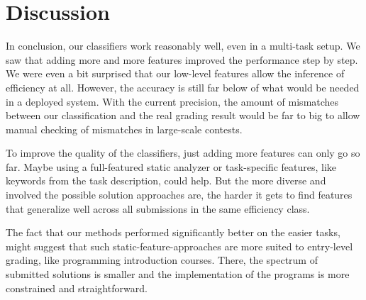 \newpage
\section{Discussion}

In conclusion, our classifiers work reasonably well, even in a multi-task setup. We saw that adding more and more features improved the performance step by step. We were even a bit surprised that our low-level features allow the inference of efficiency at all. However, the accuracy is still far below of what would be needed in a deployed system. With the current precision, the amount of mismatches between our classification and the real grading result would be far to big to allow manual checking of mismatches in large-scale contests.

To improve the quality of the classifiers, just adding more features can only go so far. Maybe using a full-featured static analyzer or task-specific features, like keywords from the task description, could help. But the more diverse and involved the possible solution approaches are, the harder it gets to find features that generalize well across all submissions in the same efficiency class.

The fact that our methods performed significantly better on the easier tasks, might suggest that such static-feature-approaches are more suited to entry-level grading, like programming introduction courses. There, the spectrum of submitted solutions is smaller and the implementation of the programs is more constrained and straightforward.